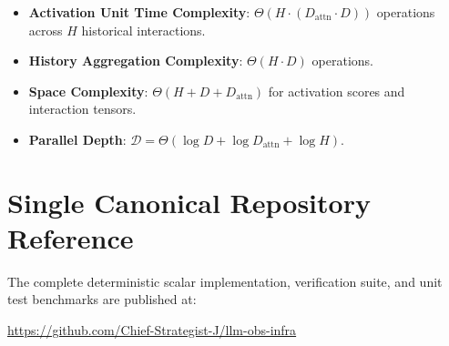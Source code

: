 \documentclass[11pt,a4paper]{article}
\theoremstyle{definition}
\begin{document}
\begin{itemize}
    \item \textbf{Activation Unit Time Complexity}: $\Theta(H \cdot (D_{\text{attn}} \cdot D))$ operations across $H$ historical interactions.
    \item \textbf{History Aggregation Complexity}: $\Theta(H \cdot D)$ operations.
    \item \textbf{Space Complexity}: $\Theta(H + D + D_{\text{attn}})$ for activation scores and interaction tensors.
    \item \textbf{Parallel Depth}: $\mathcal{D} = \Theta(\log D + \log D_{\text{attn}} + \log H)$.
\end{itemize}

\section{Single Canonical Repository Reference}

The complete deterministic scalar implementation, verification suite, and unit test benchmarks are published at:
\begin{center}
\url{https://github.com/Chief-Strategist-J/llm-obs-infra}
\end{center}
\end{document}
